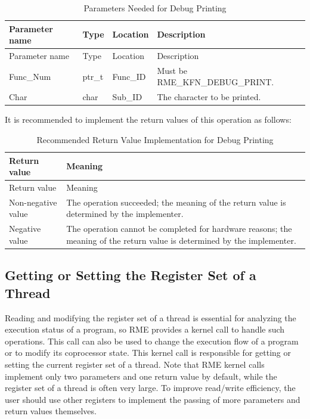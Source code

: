 \begin{xltabular}{\textwidth}{@{}>{\hsize\raggedright\arraybackslash}X>{\hsize\raggedright\arraybackslash}X>{\hsize\raggedright\arraybackslash}X>{\hsize\raggedright\arraybackslash}X@{}}
\caption{Parameters Needed for Debug Printing}\label{tab:8-109-debug-print-parameters}\\
\toprule
Parameter name & Type & Location & Description\tabularnewline
\endfirsthead
\toprule
Parameter name & Type & Location & Description\tabularnewline
\midrule
\endhead
\bottomrule
\endlastfoot
Func\_Num & ptr\_t & Func\_ID & Must be RME\_KFN\_DEBUG\_PRINT.\tabularnewline
Char & char & Sub\_ID & The character to be printed.\tabularnewline
\end{xltabular}
\nopagebreak[4]

It is recommended to implement the return values of this operation as follows:

\begin{xltabular}{\textwidth}{@{}>{\hsize\raggedright\arraybackslash}X>{\hsize\raggedright\arraybackslash}X@{}}
\caption{Recommended Return Value Implementation for Debug Printing}\label{tab:8-110-debug-print-suggested-return-values}\\
\toprule
Return value & Meaning\tabularnewline
\endfirsthead
\toprule
Return value & Meaning\tabularnewline
\midrule
\endhead
\bottomrule
\endlastfoot
    Non-negative value & The operation succeeded; the meaning of the return value is determined by the implementer.\tabularnewline
    Negative value & The operation cannot be completed for hardware reasons; the meaning of the return value is determined by the implementer.\tabularnewline
\end{xltabular}
\nopagebreak[4]

\subsection{Getting or Setting the Register Set of a Thread}\label{subsec:8-get-or-set-thread-register-set}

Reading and modifying the register set of a thread is essential for analyzing the execution status of a program, so RME provides a kernel call to handle such operations. This call can also be used to change the execution flow of a program or to modify its coprocessor state. This kernel call is responsible for getting or setting the current register set of a thread. Note that RME kernel calls implement only two parameters and one return value by default, while the register set of a thread is often very large. To improve read/write efficiency, the user should use other registers to implement the passing of more parameters and return values themselves.

